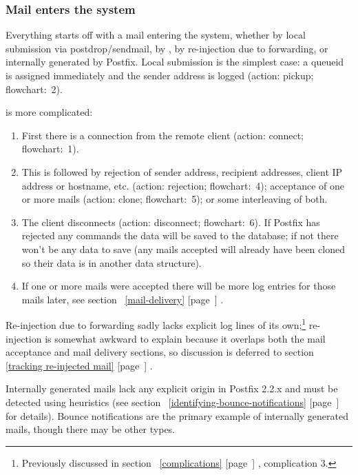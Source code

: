 \documentclass[a4paper,12pt,draft]{article}
\newcommand{\refwithpage}[1]{%
    \empty{}\ref{#1} [page~\pageref{#1}]%
}
\begin{document}
\subsubsection{Mail enters the system}

\label{mail-enters-the-system}

Everything starts off with a mail entering the system, whether by local
submission via postdrop/sendmail, by \SMTP{}, by re-injection due to
forwarding, or internally generated by Postfix.  Local submission is the
simplest case: a queueid is assigned immediately and the sender address is
logged (action: pickup; flowchart:~2).

\SMTP{} is more complicated: 

\begin{enumerate}
        
    \item First there is a connection from the remote client
        (action: connect; flowchart:~1).

    \item This is followed by rejection of sender address, recipient
        addresses, client IP address or hostname, etc. (action: rejection;
        flowchart:~4); acceptance of one or more mails (action: clone;
        flowchart:~5); or some interleaving of both.
        
    \item The client disconnects (action: disconnect; flowchart:~6).  If
        Postfix has rejected any \SMTP{} commands the data will be saved to
        the database; if not there won't be any data to save (any mails
        accepted will already have been cloned so their data is in another
        data structure).

    \item If one or more mails were accepted there will be more log entries
        for those mails later, see section~\refwithpage{mail-delivery}.

\end{enumerate}

Re-injection due to forwarding sadly lacks explicit log lines of its
own;\footnote{Previously discussed in section~\refwithpage{complications},
complication 3.} re-injection is somewhat awkward to explain because it
overlaps both the mail acceptance and mail delivery sections, so discussion
is deferred to section~\refwithpage{tracking re-injected mail}.

Internally generated mails lack any explicit origin in Postfix 2.2.x and
must be detected using heuristics (see
section~\refwithpage{identifying-bounce-notifications} for details).
Bounce notifications are the primary example of internally generated mails,
though there may be other types.
\end{document}

